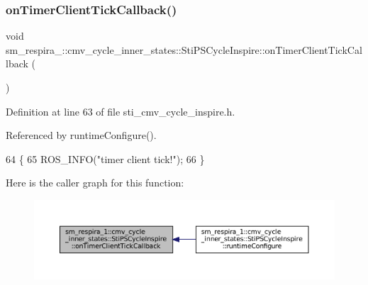\subsubsection{\texorpdfstring{on\+Timer\+Client\+Tick\+Callback()}{onTimerClientTickCallback()}}
{\footnotesize\ttfamily void sm\+\_\+respira\+\_\+::cmv\+\_\+cycle\+\_\+inner\+\_\+states\+::\+Sti\+P\+S\+Cycle\+Inspire\+::on\+Timer\+Client\+Tick\+Callback (\begin{DoxyParamCaption}{ }\end{DoxyParamCaption})\hspace{0.3cm}{\ttfamily [inline]}}



Definition at line 63 of file sti\+\_\+cmv\+\_\+cycle\+\_\+inspire.\+h.



Referenced by runtime\+Configure().


\begin{DoxyCode}
64   \{
65     ROS\_INFO(\textcolor{stringliteral}{"timer client tick!"});
66   \}
\end{DoxyCode}
Here is the caller graph for this function\+:
\nopagebreak
\begin{figure}[H]
\begin{center}
\leavevmode
\includegraphics[width=350pt]{structsm__respira__1_1_1cmv__cycle__inner__states_1_1StiPSCycleInspire_ae80efcc3db4156c258e3b6cb08e9e1bb_icgraph}
\end{center}
\end{figure}
\mbox{\label{structsm__respira__1_1_1cmv__cycle__inner__states_1_1StiPSCycleInspire_afa2d2360bb3a678a6c96cf8ffd0564bb}} 
